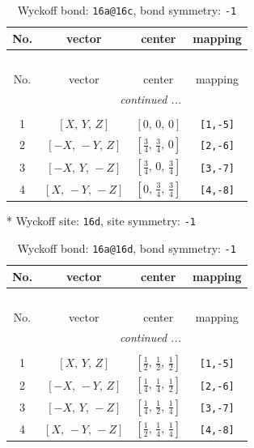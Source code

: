 \documentclass[fleqn,8pt]{jsarticle}
\begin{document}
\begin{longtable}{cccc}
\caption{Wyckoff bond: {\tt 16a@16c}, bond symmetry: {\tt -1}}
 \\
 \hline \hline
No. & vector & center & mapping \\ \hline \endfirsthead

\multicolumn{3}{l}{\tablename\ \thetable{}} \\
 \hline \hline
No. & vector & center & mapping \\ \hline \endhead

 \hline \hline
\multicolumn{3}{r}{\footnotesize\it continued ...} \\ \endfoot

 \hline \hline
\multicolumn{3}{r}{} \\ \endlastfoot

1 & $\left[ X,\, Y,\, Z \right]$ & $\left[ 0,\, 0,\, 0 \right]$ & {\tt [1,-5]} \\ \hline
2 & $\left[ - X,\, - Y,\, Z \right]$ & $\left[ \frac{3}{4},\, \frac{3}{4},\, 0 \right]$ & {\tt [2,-6]} \\ \hline
3 & $\left[ - X,\, Y,\, - Z \right]$ & $\left[ \frac{3}{4},\, 0,\, \frac{3}{4} \right]$ & {\tt [3,-7]} \\ \hline
4 & $\left[ X,\, - Y,\, - Z \right]$ & $\left[ 0,\, \frac{3}{4},\, \frac{3}{4} \right]$ & {\tt [4,-8]} \\
\end{longtable}
* Wyckoff site: {\tt 16d}, site symmetry: {\tt -1}
\renewcommand{\arraystretch}{1.2}
\begin{longtable}{cccc}
\caption{Wyckoff bond: {\tt 16a@16d}, bond symmetry: {\tt -1}}
 \\
 \hline \hline
No. & vector & center & mapping \\ \hline \endfirsthead

\multicolumn{3}{l}{\tablename\ \thetable{}} \\
 \hline \hline
No. & vector & center & mapping \\ \hline \endhead

 \hline \hline
\multicolumn{3}{r}{\footnotesize\it continued ...} \\ \endfoot

 \hline \hline
\multicolumn{3}{r}{} \\ \endlastfoot

1 & $\left[ X,\, Y,\, Z \right]$ & $\left[ \frac{1}{2},\, \frac{1}{2},\, \frac{1}{2} \right]$ & {\tt [1,-5]} \\ \hline
2 & $\left[ - X,\, - Y,\, Z \right]$ & $\left[ \frac{1}{4},\, \frac{1}{4},\, \frac{1}{2} \right]$ & {\tt [2,-6]} \\ \hline
3 & $\left[ - X,\, Y,\, - Z \right]$ & $\left[ \frac{1}{4},\, \frac{1}{2},\, \frac{1}{4} \right]$ & {\tt [3,-7]} \\ \hline
4 & $\left[ X,\, - Y,\, - Z \right]$ & $\left[ \frac{1}{2},\, \frac{1}{4},\, \frac{1}{4} \right]$ & {\tt [4,-8]} \\
\end{longtable}
\end{document}
